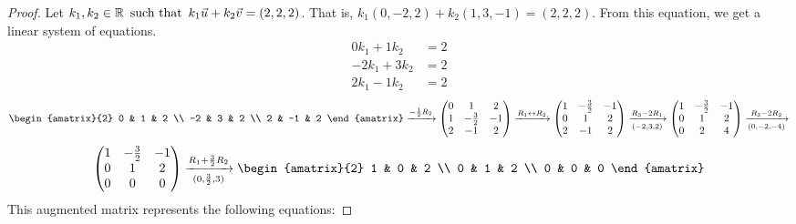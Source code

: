 \begin{enumerate}
  \begin{proof}
    Let $k_1,k_2 \in \mathbb{R} \operatorname{~\text{such that}~} k_1\vec{u} + k_2\vec{v} = (2,2,2)$. That is, $k_1(0,-2,2) + k_2(1,3,-1) = (2,2,2)$. From this equation, we get a linear system of equations.
    \begin{align*}
      0k_1 + 1k_2  & = 2 \\
      -2k_1 + 3k_2 & = 2 \\
      2k_1 - 1k_2  & = 2
    \end{align*}
    \[
      \begin{amatrix}{2}
        0  & 1  & 2 \\
        -2 & 3  & 2 \\
        2  & -1 & 2
      \end{amatrix} \xrightarrow{-\frac{1}{2}R_2}
      \begin{pmatrix}
        0 & 1            & 2  \\
        1 & -\frac{3}{2} & -1 \\
        2 & -1           & 2
      \end{pmatrix} \xrightarrow{R_1 \leftrightarrow R_2}
      \begin{pmatrix}
        1 & -\frac{3}{2} & -1 \\
        0 & 1            & 2  \\
        2 & -1           & 2
      \end{pmatrix} \xrightarrow[(-2, 3, 2)]{R_3 - 2R_1}
      \begin{pmatrix}
        1 & -\frac{3}{2} & -1 \\
        0 & 1            & 2  \\
        0 & 2            & 4
      \end{pmatrix} \xrightarrow[(0,-2,-4)]{R_3 - 2R_2}
    \]
    \[
      \begin{pmatrix}
        1 & -\frac{3}{2} & -1 \\
        0 & 1            & 2  \\
        0 & 0            & 0
      \end{pmatrix} \xrightarrow[(0,\frac{3}{2},3)]{R_1 + \frac{3}{2}R_2}
      \begin{amatrix}{2}
        1 & 0 & 2 \\
        0 & 1 & 2 \\
        0 & 0 & 0
      \end{amatrix}
    \]
    This augmented matrix represents the following equations:

\end{proof}
\end{enumerate}
